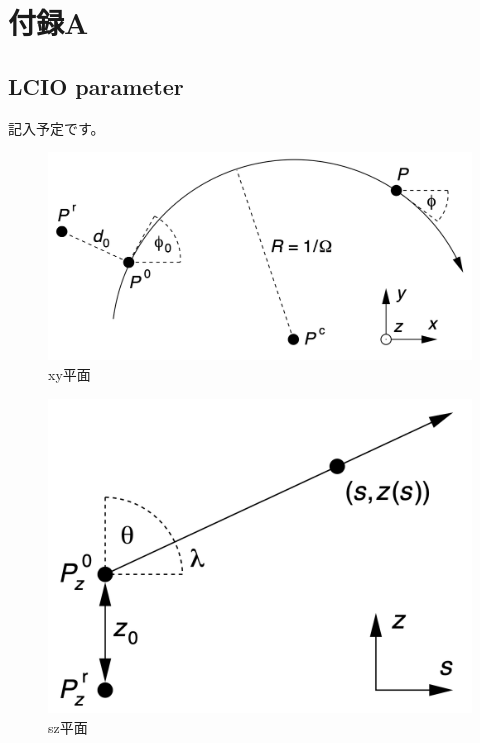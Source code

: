 
\appendix 

\chapter{付録A} \label{sec:Appendix}
\section{LCIO parameter}
記入予定です。
\begin{figure}[H]
	\begin{center}
 \includegraphics[keepaspectratio, scale=0.4]
 	{Figure/Appendix/xy.png}
 		\caption{xy平面}
 		\label{xy}
	\end{center}
\end{figure}
\begin{figure}[H]
	\begin{center}
 \includegraphics[keepaspectratio, scale=0.4]
 	{Figure/Appendix/sz.png}
 		\caption{sz平面}
 		\label{sz}
	\end{center}
\end{figure}
